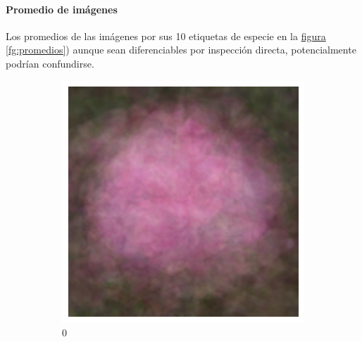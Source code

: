 \documentclass{article}
\begin{document}

\paragraph{Promedio de imágenes} Los promedios de las imágenes por sus 10 etiquetas de especie en la \hyperref[fg:promedios]{figura \ref*{fg:promedios}}) aunque sean diferenciables por inspección directa, potencialmente podrían confundirse.

\begin{figure}
	\centering
	\begin{subfigure}[b]{0.09\textwidth}
		\includegraphics[width= \textwidth]{ave0}
		\caption{0}
	\end{subfigure}
	\begin{subfigure}[b]{0.09\textwidth}

\end{subfigure}
\end{figure}
\end{document}

